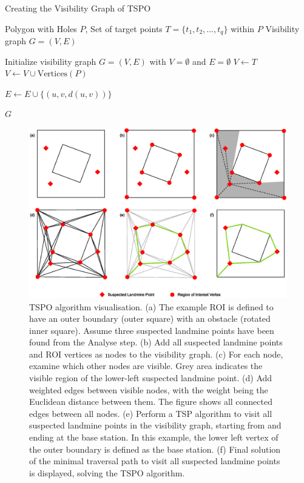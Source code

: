 \begin{algorithm}[h!]
\caption{Creating the Visibility Graph of \gls{TSPO}}
\label{alg:msp_tspo2visgraph}
\begin{algorithmic}[1]
\Require Polygon with Holes $P$, Set of target points $T = \{t_1, t_2, \ldots, t_q\}$ within $P$
\Ensure Visibility graph $G = (V, E)$

\State Initialize visibility graph $G = (V, E)$ with $V = \emptyset$ and $E = \emptyset$
\State $V \leftarrow T$ 
\State $V \leftarrow V \cup \text{Vertices}(P)$ 

            \State $E \leftarrow E \cup \{(u, v, d(u, v))\}$ 
        \EndIf
    \EndFor
\EndFor

\Return $G$ 
\end{algorithmic}
\end{algorithm}

\begin{figure}[h!]
    \centering
    \includegraphics[width=\linewidth]{figs/Jihwan/TSPO Algorithm Visualisation.eps}
    \caption[TSP-O Algorithm Visualisation]
    {\gls{TSPO} algorithm visualisation. (a) The example \gls{ROI} is defined to have an outer boundary (outer square) with an obstacle (rotated inner square). Assume three suspected landmine points have been found from the Analyse step. (b) Add all suspected landmine points and \gls{ROI} vertices as nodes to the visibility graph. (c) For each node, examine which other nodes are visible. Grey area indicates the visible region of the lower-left suspected landmine point. (d) Add weighted edges between visible nodes, with the weight being the Euclidean distance between them. The figure shows all connected edges between all nodes. (e) Perform a \gls{TSP} algorithm to visit all suspected landmine points in the visibility graph, starting from and ending at the base station. In this example, the lower left vertex of the outer boundary is defined as the base station. (f) Final solution of the minimal traversal path to visit all suspected landmine points is displayed, solving the \gls{TSPO} algorithm. 
    }
    \label{fig:msp_tspo}
\end{figure}

